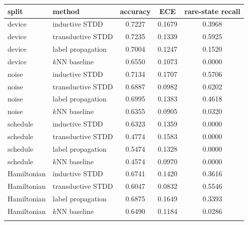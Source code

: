 \begin{tabular}{llccc}
\toprule
split & method & accuracy & ECE & rare-state recall \\
\midrule
device & inductive STDD & 0.7227 & 0.1679 & 0.3968 \\
device & transductive STDD & 0.7235 & 0.1339 & 0.5925 \\
device & label propagation & 0.7004 & 0.1247 & 0.1520 \\
device & $k$NN baseline & 0.6550 & 0.1073 & 0.0000 \\
\addlinespace[2pt]
noise & inductive STDD & 0.7134 & 0.1707 & 0.5706 \\
noise & transductive STDD & 0.6887 & 0.0982 & 0.6202 \\
noise & label propagation & 0.6995 & 0.1383 & 0.4618 \\
noise & $k$NN baseline & 0.6355 & 0.0905 & 0.0320 \\
\addlinespace[2pt]
schedule & inductive STDD & 0.6323 & 0.1359 & 0.0000 \\
schedule & transductive STDD & 0.4774 & 0.1583 & 0.0000 \\
schedule & label propagation & 0.5474 & 0.1328 & 0.0000 \\
schedule & $k$NN baseline & 0.4574 & 0.0970 & 0.0000 \\
\addlinespace[2pt]
Hamiltonian & inductive STDD & 0.6741 & 0.1420 & 0.3616 \\
Hamiltonian & transductive STDD & 0.6047 & 0.0832 & 0.5546 \\
Hamiltonian & label propagation & 0.6875 & 0.1649 & 0.3393 \\
Hamiltonian & $k$NN baseline & 0.6490 & 0.1184 & 0.0286 \\
\addlinespace[2pt]
\bottomrule
\end{tabular}
